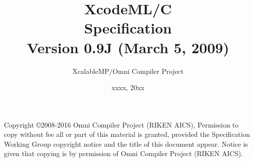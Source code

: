 \documentclass[a4paper,11pt,twoside]{article}
\title{{\Huge XcodeML/C}\\
Specification\\
\vspace{2cm}
Version 0.9J (March 5, 2009)\\ }
\author{
\Large XcalableMP/Omni Compiler Project\\
}
\date{\vspace{4cm}\Large xxxx, 20xx}
\begin{document}
\maketitle

Copyright \copyright 2008-2016 Omni Compiler Project (RIKEN AICS),
Permission to copy without fee all or part of this material is granted,
provided the {\XMP} Specification Working Group copyright notice and the
title of this document appear. Notice is given that copying is by permission
of Omni Compiler Project (RIKEN AICS).

\clearpage

\cleardoublepage

\tableofcontents
\listoffigures
\listoftables



\newpage
\mbox{}\newpage

\pagestyle{fancy}
\fancyhead{} %
\fancyhead[RE]{\leftmark}
\fancyhead[LO]{\rightmark}
\fancyhead[LE,RO]{\thepage}
\fancyfoot{} %
\renewcommand{\headrulewidth}{0pt}
\renewcommand{\footrulewidth}{0pt}












\cleardoublepage





\end{document}
